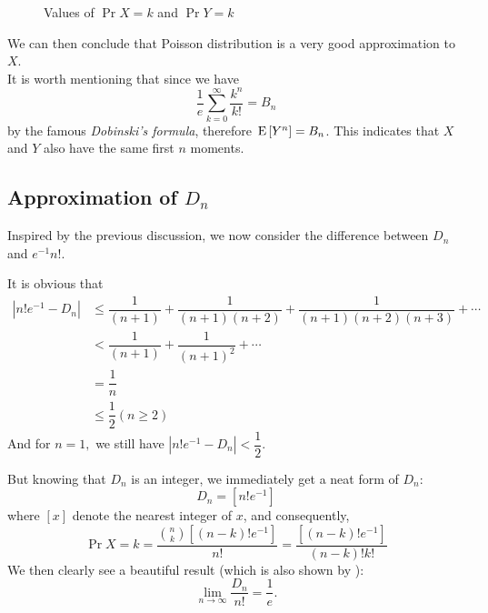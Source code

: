 \begin{figure}[H]
{  }
  \caption{Values of $ \Pr{X=k}$ and $ \Pr{Y=k}$\label{fig:diff}}
\end{figure}

We can then conclude that Poisson distribution is a very good approximation to $ X$.
\\

It is worth mentioning that since we have
\[ \dfrac{1}{e}\sum_{k=0}^{\infty}\dfrac{k^n}{k!} = B_n\]
by the famous \emph{Dobinski's formula}\cite{wiki_dob}, therefore $\text{E}\left[Y^n\right] = B_n$. This indicates that $ X$ and
$ Y$ also have the same first $ n$ moments.

\subsection{Approximation of $ D_n$}
Inspired by the previous discussion, we now consider the difference between $ D_n $ and $ e^{-1}n!$.

It is obvious that
\begin{align*}
|n! e^{-1} - D_n| & \le \dfrac{1}{(n+1)}+\dfrac{1}{(n+1)(n+2)}+ \dfrac{1}{(n+1)(n+2)(n+3)}+\cdots \\
&< \dfrac{1}{(n+1)} + \dfrac{1}{(n+1)^2 }+ \cdots  \\
& =\dfrac{1}{n}\\
& \le \dfrac{1}{2} ( n \ge 2)
\end{align*}
And for $ n=1,$ we still have $ |n!e^{-1}-D_n| < \dfrac{1}{2}.$

But knowing that $ D_n$ is an integer, we immediately get a neat form of $ D_n$:
\[  D_n = [ n!e^{-1}]\]
where $ [x]$ denote the nearest integer of $ x$, and consequently,
\[ \Pr{X=k} = \dfrac{{n\choose{k}}[(n-k)!e^{-1}]}{n!}= \dfrac{[(n-k)!e^{-1}]}{(n-k)!k!}\]
We then clearly see a beautiful result (which is also shown by ):
\[ \lim\limits_{n\to\infty}\dfrac{D_n}{n!} = \dfrac{1}{e}.\]

